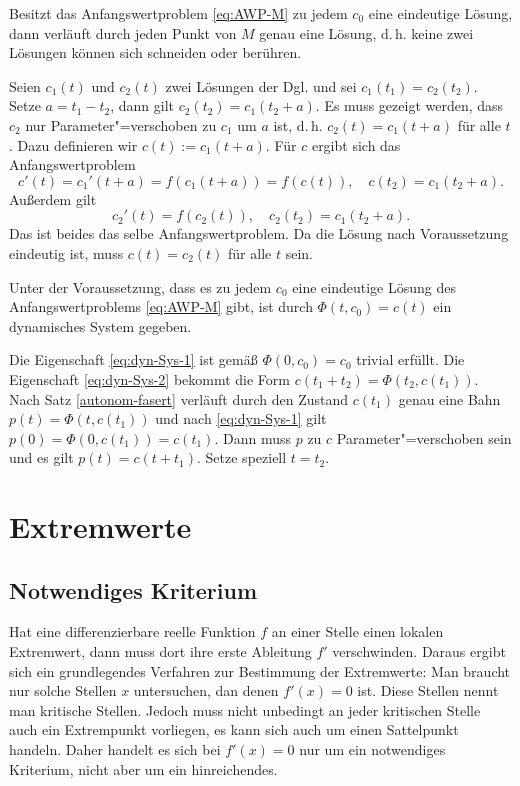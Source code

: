 \begin{theorem}\label{autonom-fasert}
Besitzt das Anfangswertproblem \eqref{eq:AWP-M} zu jedem $c_0$ eine
eindeutige Lösung, dann verläuft durch jeden Punkt von $M$ genau
eine Lösung, d.\,h. keine zwei Lösungen können sich schneiden
oder berühren.
\end{theorem}
\noindent{}
Seien $c_1(t)$ und $c_2(t)$ zwei Lösungen der Dgl. und sei
$c_1(t_1)=c_2(t_2)$. Setze $a=t_1-t_2$, dann gilt $c_2(t_2)=c_1(t_2+a)$.
Es muss gezeigt werden, dass $c_2$ nur Parameter"=verschoben
zu $c_1$ um $a$ ist, d.\,h. $c_2(t)=c_1(t+a)$ für alle $t$. Dazu
definieren wir $c(t):=c_1(t+a)$. Für $c$ ergibt sich das
Anfangswertproblem
\begin{equation}
c'(t) = c_1'(t+a) = f(c_1(t+a)) = f(c(t)),\quad c(t_2)=c_1(t_2+a).
\end{equation}
Außerdem gilt
\begin{equation}
c_2'(t) = f(c_2(t)), \quad c_2(t_2)=c_1(t_2+a).
\end{equation}
Das ist beides das selbe Anfangswertproblem. Da die Lösung nach
Voraussetzung eindeutig ist, muss $c(t)=c_2(t)$
für alle $t$ sein.\;\qedsymbol

\begin{theorem}
Unter der Voraussetzung, dass es zu jedem $c_0$ eine eindeutige
Lösung des Anfangswertproblems \eqref{eq:AWP-M} gibt, ist durch
$\Phi(t,c_0)=c(t)$ ein dynamisches System gegeben.
\end{theorem}
\noindent{}
Die Eigenschaft \eqref{eq:dyn-Sys-1} ist gemäß $\Phi(0,c_0)=c_0$
trivial erfüllt. Die Eigenschaft \eqref{eq:dyn-Sys-2} bekommt
die Form $c(t_1+t_2)=\Phi(t_2,c(t_1))$. Nach Satz
\ref{autonom-fasert} verläuft durch den Zustand $c(t_1)$ genau
eine Bahn $p(t)=\Phi(t,c(t_1))$ und nach \eqref{eq:dyn-Sys-1} gilt
$p(0)=\Phi(0,c(t_1))=c(t_1)$. Dann muss $p$ zu $c$ Parameter"=verschoben
sein und es gilt $p(t)=c(t+t_1)$. Setze speziell $t=t_2$.\;\qedsymbol

\newpage
\section{Extremwerte}

\subsection{Notwendiges Kriterium}

Hat eine differenzierbare reelle Funktion $f$ an einer Stelle einen
lokalen Extremwert, dann muss dort ihre erste Ableitung $f'$
verschwinden. Daraus ergibt sich ein grundlegendes Verfahren zur
Bestimmung der Extremwerte: Man braucht nur solche Stellen $x$
untersuchen, dan denen $f'(x)=0$ ist. Diese Stellen nennt man
kritische Stellen. Jedoch muss nicht unbedingt an jeder kritischen
Stelle auch ein Extrempunkt vorliegen, es kann sich auch um einen
Sattelpunkt handeln. Daher handelt es sich bei $f'(x)=0$ nur um
ein notwendiges Kriterium, nicht aber um ein hinreichendes.

